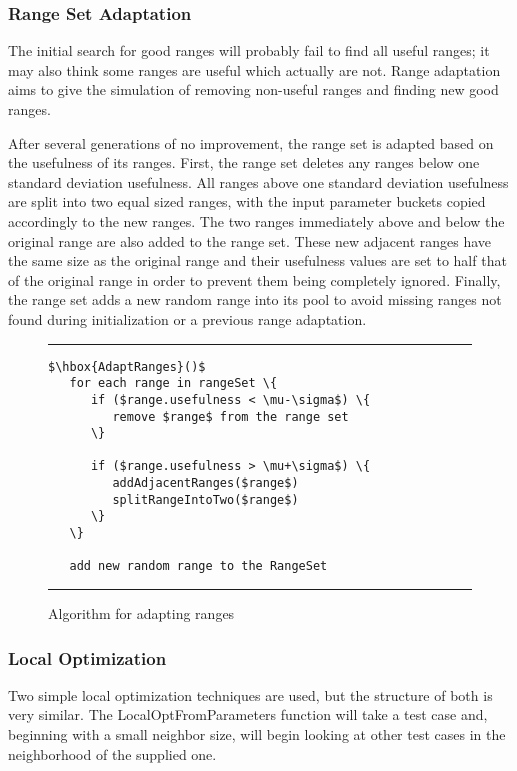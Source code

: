 \documentclass[runningheads]{llncs}
\begin{document}
\FloatBarrier
\subsubsection{Range Set Adaptation}
The initial search for good ranges will probably fail to find all useful ranges; it may also think some ranges are useful which actually are not. Range adaptation aims to give the simulation of removing non-useful ranges and finding new good ranges.

After several generations of no improvement, the range set is adapted based on the usefulness of its ranges. First, the range set deletes any ranges below one standard deviation usefulness. All ranges above one standard deviation usefulness are split into two equal sized ranges, with the input parameter buckets copied accordingly to the new ranges. The two ranges immediately above and below the original range are also added to the range set. These new adjacent ranges have the same size as the original range and their usefulness values are set to half that of the original range in order to prevent them being completely ignored. Finally, the range set adds a new random range into its pool to avoid missing ranges not found during initialization or a previous range adaptation.

\begin{figure}[h!]
\begin{center}
\hrule
\medskip
\begin{Verbatim}[fontfamily=tt, xleftmargin=10pt, commandchars=\\\{\},
   codes={\catcode`$=3\catcode`^=7\catcode`_=8}]
$\hbox{AdaptRanges}()$    
   for each range in rangeSet \{
      if ($range.usefulness < \mu-\sigma$) \{
         remove $range$ from the range set
      \}
      
      if ($range.usefulness > \mu+\sigma$) \{
         addAdjacentRanges($range$)
         splitRangeIntoTwo($range$)
      \}
   \}   
   
   add new random range to the RangeSet
\end{Verbatim}
\hrule
\end{center}
\caption{Algorithm for adapting ranges \label{fig:adptRang}}
\end{figure}

\FloatBarrier
\subsubsection{Local Optimization}
Two simple local optimization techniques are used, but the structure of both is very similar. The LocalOptFromParameters function will take a test case and, beginning with a small neighbor size, will begin looking at other test cases in the neighborhood of the supplied one. 
\end{document}
